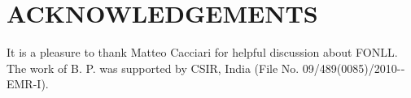 \documentclass{iopart}
\begin{document}
\section*{ACKNOWLEDGEMENTS}
It is a pleasure to thank Matteo Cacciari for helpful discussion about FONLL. The work of B. P. 
was supported by CSIR, India (File No. 09/489(0085)/2010-­EMR-­I). 
 
 

\end{document}
